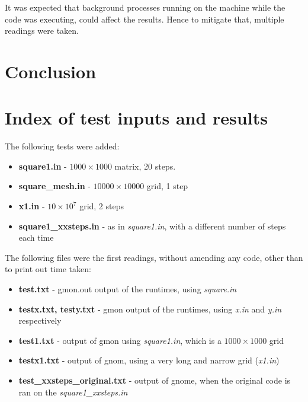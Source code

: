 \documentclass[11pt,journal]{IEEEtran}
\begin{document}
	It was expected that background processes running on the machine while the code was executing, could affect the results. Hence to mitigate that, multiple readings were taken.
	
	
	\section{Conclusion}

	
	
	
	
		
		
	\appendices
	\section{Index of test inputs and results}
	The following tests were added:
	\begin{itemize}
		\item \textbf{square1.in} - $1000 \times 1000$ matrix, 20 steps.
		\item \textbf{square\_mesh.in} - $10000 \times 10000$ grid, 1 step
		\item \textbf{x1.in} - $10 \times 10^7$ grid, 2 steps
		\item \textbf{square1\_xxsteps.in} - as in \emph{square1.in}, with a different number of steps each time

	\end{itemize}
	
	The following files were the first readings, without amending any code, other than to print out time taken:
	
	\begin{itemize}
		\item \textbf{test.txt} - gmon.out output of the runtimes, using \emph{square.in}
		\item \textbf{testx.txt, testy.txt} - gmon output of the runtimes, using \emph{x.in} and \emph{y.in} respectively
		\item \textbf{test1.txt} - output of gmon using \emph{square1.in}, which is a $1000 \times 1000$ grid
		\item \textbf{testx1.txt} - output of gnom, using a very long and narrow grid (\emph{x1.in})
		\item \textbf{test\_xxsteps\_original.txt} - output of gnome, when the original code is ran on the \emph{square1\_xxsteps.in}
	
	\end{itemize}
\end{document}
